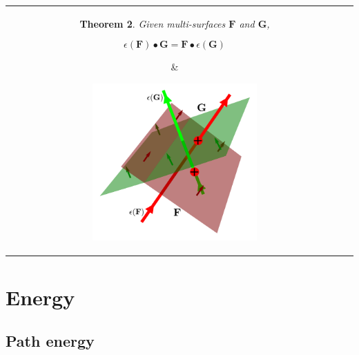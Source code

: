 \documentclass{book}
\newtheorem{thm}{Theorem}
\begin{document}
\begin{tabular}{cc}
\parbox{0.5\textwidth}{
\begin{thm}
Given multi-surfaces \(\mathbf{F}\) and \(\mathbf{G}\), 

\[\epsilon(\mathbf{F}) \bullet \mathbf{G} = \mathbf{F} \bullet \epsilon(\mathbf{G})\]
\end{thm}
} & \parbox{0.5\textwidth}{
\includegraphics[width = 0.5\textwidth]{Duality/path_surface_duality_intersection}
}
\end{tabular}



%
%
%





\section{Energy}

\subsection{Path energy}
\end{document}
